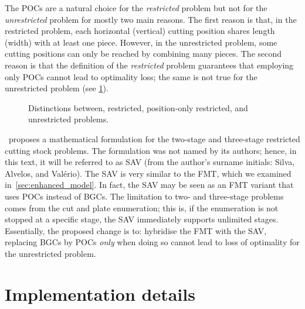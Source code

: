 \documentclass[ppgc,tese,english,formais,babel]{iiufrgs}
\begin{document}
The POCs are a natural choice for the \emph{restricted} problem but not for the \emph{unrestricted} problem for mostly two main reasons.
The first reason is that, in the restricted problem, each horizontal (vertical) cutting position shares length (width) with at least one piece.
However, in the unrestricted problem, some cutting positions can only be reached by combining many pieces.
The second reason is that the definition of the \emph{restricted} problem guarantees that employing only POCs cannot lead to optimality loss; the same is not true for the unrestricted problem (see \cref{fig:distinctions_restricted_unrestricted}).

\begin{figure}[h]
  \caption{Distinctions between, restricted, position-only restricted, and unrestricted problems.}
  \center
  
  \label{fig:distinctions_restricted_unrestricted}
\end{figure}

\citet{silva:2010}~proposes a mathematical formulation for the two-stage and three-stage restricted cutting stock problems.
The formulation was not named by its authors; hence, in this text, it will be referred to as SAV (from the author's surname initials: Silva, Alvelos, and Valério).
The SAV is very similar to the FMT, which we examined in~\cref{sec:enhanced_model}.
In fact, the SAV may be seen as an FMT variant that uses POCs instead of BGCs.
The limitation to two- and three-stage problems comes from the cut and plate enumeration; this is, if the enumeration is not stopped at a specific stage, the SAV immediately supports unlimited stages.
Essentially, the proposed change is to: hybridise the FMT with the SAV, replacing BGCs by POCs \emph{only} when doing so cannot lead to loss of optimality for the unrestricted problem.

\section{Implementation details}
\end{document}

